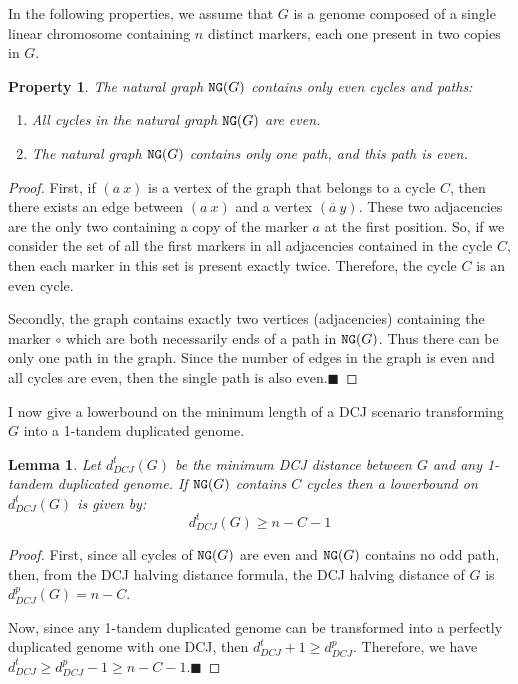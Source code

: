 \documentclass[11pt,final,twoside,nofrench]{thlifl}
\newcommand{\qed}{\ensuremath{\blacksquare}}
\newcommand{\fst}[1]{ \ensuremath{#1} }
\newcommand{\snd}[1]{ \ensuremath{\overline{#1}} }
\newcommand\aff[2]{\ensuremath{(\fst{#1}~\fst{#2})}}
\newcommand\asf[2]{\ensuremath{(\snd{#1}~\fst{#2})}}
\renewcommand{\NG}{\ensuremath{\mbox{\texttt{NG}}}}
\newtheorem{property}{Property}
\newtheorem{proof}{Proof}
\newtheorem{lemma}{Lemma}
\begin{document}
In the following properties, we assume that $G$ is a genome composed of a 
single linear chromosome containing $n$ distinct markers, each one present 
in two copies in $G$. 

\begin{property}
The natural graph $\NG(G)$ contains only even cycles and paths: 
\label{prop:EC}
\label{prop:1EP}
\begin{enumerate}
\item All cycles in the natural graph $\NG(G)$ are even.
\item The natural graph $\NG(G)$ contains only one path, and this path is even.
\end{enumerate}
\end{property}

\begin{proof}
    First, if \aff{a}{x} is a vertex of the
    graph that belongs to a cycle $C$, then there exists an edge between
    \aff{a}{x} and a vertex \asf{a}{y}. These two
    adjacencies are the only two containing a copy of the marker $a$ at the
    first position. So, if we consider the set of all the first markers in
    all adjacencies contained in the cycle $C$, then each marker in this set is
    present exactly twice. Therefore, the cycle $C$ is an even cycle.
  
    Secondly, the graph contains exactly two vertices (adjacencies) containing the
    marker $\circ$ which are both necessarily ends of a path in $\NG(G)$. Thus
   there can be only one path in the graph. Since the number of edges in the 
   graph is even and all cycles are even, then the single path is also even.\qed
\end{proof}

I now give a lowerbound on the minimum length of a DCJ scenario transforming 
$G$ into a 1-tandem duplicated genome.

\begin{lemma}
    Let $d^t_{DCJ}(G)$  be the minimum DCJ distance between $G$ and any 
   1-tandem duplicated genome. If $\NG(G)$ contains $C$ cycles then a 
   lowerbound on $d^t_{DCJ}(G)$ is given by:
    $$d^t_{DCJ}(G) \geq n - C - 1$$
\label{DCJdistLB}
\end{lemma}

\begin{proof}
    First, since all cycles  of $\NG(G)$ are even and $\NG(G)$ contains no odd 
    path, 
   then, from the DCJ halving distance formula, the DCJ halving distance of 
   $G$   is $d^p_{DCJ}(G) = n - C$.

    Now, since any  1-tandem duplicated genome can be transformed into 
    a perfectly duplicated genome with one DCJ, then $d^t_{DCJ} + 1
    \geq d^p_{DCJ}$. Therefore, we have $ d^t_{DCJ} \geq d^p_{DCJ} - 1 \geq
    n - C - 1$.\qed  
\end{proof}
\end{document}
